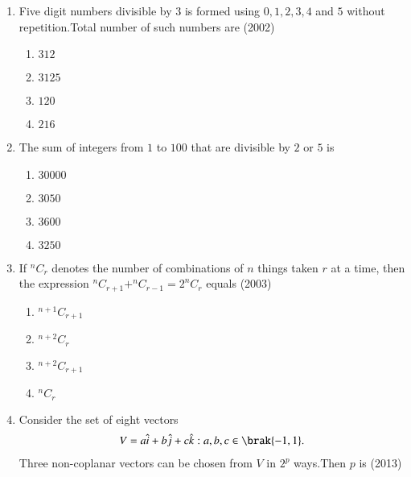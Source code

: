 \documentclass[journal,12pt,twocolumn]{IEEEtran}
\theoremstyle{remark}
\begin{document}
\begin{enumerate}
\item Five digit numbers divisible by $3$ is formed using $0,1,2,3,4$ and $5$ without repetition.Total number of such numbers are
\hfill(2002)
\begin{enumerate}
    \item $312$
    \item $3125$
    \item $120$
    \item $216$ \\
\end{enumerate}
\item The sum of integers from $1$ to $100$ that are divisible by $2$ or $5$ is
\hfill {}
\begin{enumerate}
    \item $30000$
    \item $3050$
    \item $3600$
    \item $3250$ \\
\end{enumerate}
\item If $^nC_r$ denotes the number of combinations of $n$ things taken $r$ at a time, then the expression $^nC_{r+1} + ^nC_{r-1} = 2  ^nC_r$ equals
\hfill(2003)
\begin{enumerate}
    \item$^{n+1}C_{r+1}$
    \item$^{n+2}C_r$
    \item$^{n+2}C_{r+1}$
    \item$^nC_r$\\
\end{enumerate}

\item Consider the set of eight vectors
\begin{align}
V={a\hat{i}+b\hat{j}+c\hat{k}:a,b,c \in \brak{-1,1}}.
\end{align}
Three non-coplanar vectors can be chosen from $V$ in $2^p$ ways.Then $p$ is
\hfill(2013)



\end{enumerate}
\end{document}
